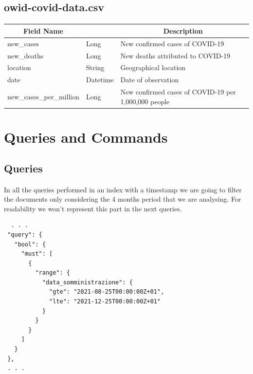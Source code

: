 \documentclass[a4paper,12pt]{article}
\begin{document}
\subsection{owid-covid-data.csv}
\paragraph{}
\begin{center}
\begin{tabular}{|m{45mm}|>{\raggedright}m{16mm}|m{75mm}|}
\hline
\multicolumn{1}{|c|}{\textbf{ Field Name }}
& \multicolumn{1}{c|}{\textbf{ Data Type }} 
    	& \multicolumn{1}{c|}{\textbf{ Description }}\\
\hline
new\_cases & Long & New confirmed cases of COVID-19 \\
\hline
new\_deaths & Long & New deaths attributed to COVID-19 \\
\hline
location & String & Geographical location \\
\hline
date & Datetime & Date of observation \\
\hline
new\_cases\_per\_million & Long & New confirmed cases of COVID-19 per 1,000,000 people \\
\hline
\end{tabular}
\end{center}
\newpage

\section{Queries and Commands}
\subsection{Queries}
\paragraph{} In all the queries performed in an index with a timestamp we are going to filter the documents only considering the 4 months period that we are analysing. For readability we won't represent this part in the next queries.
\begin{tcolorbox}[colback=pink!5!white,colframe=pink!75!black,title=FILTER]
\begin{verbatim}
  . . .
 "query": {
   "bool": {
     "must": [
       {
         "range": {
           "data_somministrazione": {
             "gte": "2021-08-25T00:00:00Z+01",
             "lte": "2021-12-25T00:00:00Z+01"
           }
         }
       }
     ]
   }
 },
 . . .
\end{verbatim}
\end{tcolorbox}
\newpage
\end{document}
